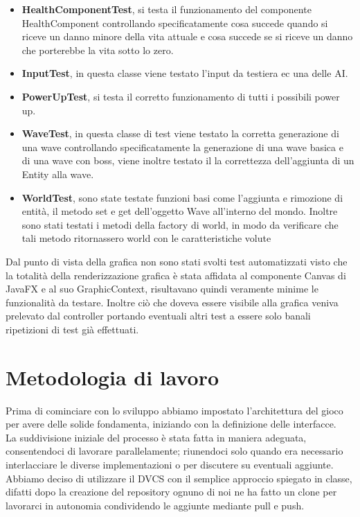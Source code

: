 \documentclass[a4paper,12pt]{report}
\begin{document}
\begin{itemize}
	\item \textbf{HealthComponentTest}, si testa il funzionamento del componente HealthComponent controllando specificatamente cosa succede quando si riceve un danno minore della vita attuale e cosa succede se si riceve un danno che porterebbe la vita sotto lo zero.
	\item \textbf{InputTest}, in questa classe viene testato l’input da testiera ec una delle AI.
	\item \textbf{PowerUpTest}, si testa il corretto funzionamento di tutti i possibili power up.
	\item \textbf{WaveTest}, in questa classe di test viene testato la corretta generazione di una wave controllando specificatamente la generazione di una wave basica e di una wave con boss, viene inoltre testato il la correttezza dell’aggiunta di un Entity alla wave.
	\item \textbf{WorldTest}, sono state testate funzioni basi come l'aggiunta e rimozione di entità, il metodo set e get dell'oggetto  Wave all'interno del mondo. Inoltre sono stati testati i metodi della factory di world, in modo da verificare che tali metodo ritornassero world con le caratteristiche volute
\end{itemize}
Dal punto di vista della grafica non sono stati svolti test automatizzati visto che la totalità della renderizzazione grafica è stata affidata al componente Canvas di JavaFX e al suo GraphicContext, risultavano quindi veramente minime le funzionalità da testare. Inoltre ciò che doveva essere visibile alla grafica veniva prelevato dal controller portando eventuali altri test a essere solo banali ripetizioni di test già effettuati.



\section{Metodologia di lavoro}

Prima di cominciare con lo sviluppo abbiamo impostato l’architettura del gioco per avere delle solide fondamenta, iniziando con la definizione delle interfacce.
\\
La suddivisione iniziale del processo è stata fatta in maniera adeguata, consentendoci di lavorare parallelamente; riunendoci solo quando era necessario interlacciare le diverse implementazioni o per discutere su eventuali aggiunte.
\\
Abbiamo deciso di utilizzare il DVCS con il semplice approccio spiegato in classe, difatti dopo la creazione del repository ognuno di noi ne ha fatto un clone per lavorarci in autonomia condividendo le aggiunte mediante pull e push.
\end{document}
